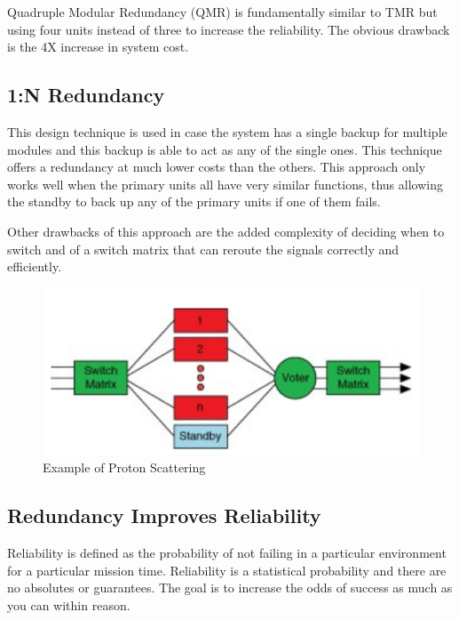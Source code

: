 \documentclass[./dissertation.tex]{subfiles}
\begin{document}
Quadruple Modular Redundancy (QMR) is fundamentally similar to TMR but using four units instead of three to increase the reliability. The obvious drawback is the 4X increase in system cost.

\subsection{1:N Redundancy}

This design technique is used in case the system has a single backup for multiple modules and this backup is able to act as any of the single ones. This technique offers a redundancy at much lower costs than the others. 
This approach only works well when the primary units all have very similar functions, thus allowing the standby to back up any of the primary units if one of them fails.

Other drawbacks of this approach are the added complexity of deciding when to switch and of a switch matrix that can reroute the signals correctly and efficiently.



\begin{figure}[h!]
\centering
  \includegraphics[scale = 0.50]{imgs/1nred.png}
  \caption{Example of Proton Scattering \cite{bib1}}
  \label{fig:1nred}
\end{figure}

\subsection{Redundancy Improves Reliability}
Reliability is defined as the probability of not failing in a particular environment for a particular mission time. Reliability is a statistical probability and there are no absolutes or guarantees. The goal is to increase the odds of success as much as you can within reason.
\end{document}

